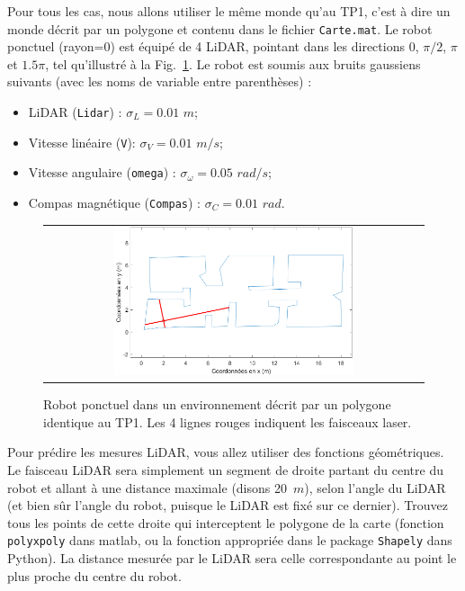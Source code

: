 \documentclass[12pt]{article}
\begin{document}
Pour tous les cas, nous allons utiliser le même monde qu'au TP1, c'est à dire un monde décrit par un polygone et contenu dans le fichier \texttt{Carte.mat}. Le robot ponctuel (rayon=0) est équipé de 4 LiDAR, pointant dans les directions 0, $\pi/2$,  $\pi$ et $1.5\pi$, tel qu'illustré à la Fig.~\ref{CartePlusRobotLiDAR}. Le robot est soumis aux bruits gaussiens suivants (avec les noms de variable entre parenthèses) :
\begin{itemize}
\item LiDAR (\texttt{Lidar}) : $\sigma_{L}=0.01$ $m$;
\item Vitesse linéaire (\texttt{V}): $\sigma_{V}=0.01$ $m/s$;
\item Vitesse angulaire (\texttt{omega}) : $\sigma_{\omega}=0.05$ $rad/s$;
\item Compas magnétique  (\texttt{Compas}) : $\sigma_{C}=0.01$ $rad$.
\end{itemize}

\begin{figure}[ht]
 \begin{center}
  \begin{tabular}{c}
    \includegraphics[width=0.65\textwidth]{CartePlusRobotLiDAR.png} 
  \end{tabular}
 \end{center}
 \vspace{-0.3in}
 \caption{Robot ponctuel dans un environnement décrit par un polygone identique au TP1. Les 4 lignes rouges indiquent les faisceaux laser.}
 \label{CartePlusRobotLiDAR}
\end{figure}

Pour prédire les mesures LiDAR, vous allez utiliser des fonctions géométriques. Le faisceau LiDAR sera simplement un segment de droite partant du centre du robot et allant à une distance maximale (disons 20~$m$), selon l'angle du LiDAR (et bien sûr l'angle du robot, puisque le LiDAR est fixé sur ce dernier). Trouvez tous les points de cette droite qui interceptent le polygone de la carte (fonction \texttt{polyxpoly} dans matlab, ou la fonction appropriée dans le package  \texttt{Shapely} dans Python).  La distance mesurée par le LiDAR sera celle correspondante au point le plus proche du centre du robot.
\end{document}
